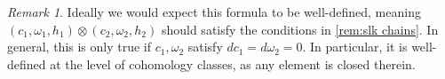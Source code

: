 \documentclass[10pt]{amsart}
\theoremstyle{definition}
\theoremstyle{remark}
\newtheorem{remark}[equation]{Remark}
\begin{document}
\begin{remark}
  Ideally we would expect this formula to be well-defined, meaning $(c_1, \omega_1, h_1) \otimes (c_2, \omega_2, h_2)$ should satisfy the conditions in \cref{rem:slk chains}. In general, this is only true if $c_1,\omega_2$ satisfy $dc_1 = d\omega_2 = 0$. In particular, it is well-defined at the level of cohomology classes, as any element is closed therein.
\end{remark}




{\footnotesize


}
\end{document}
